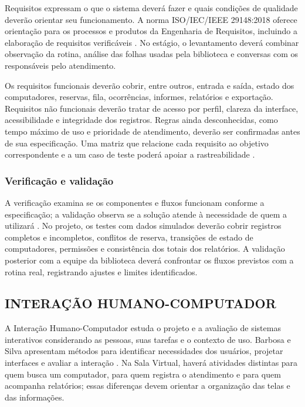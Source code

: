 \documentclass[12pt,a4paper]{article}
\begin{document}
Requisitos expressam o que o sistema deverá fazer e quais condições de qualidade deverão orientar seu funcionamento. A norma ISO/IEC/IEEE 29148:2018 oferece orientação para os processos e produtos da Engenharia de Requisitos, incluindo a elaboração de requisitos verificáveis \cite{iso29148_2018}. No estágio, o levantamento deverá combinar observação da rotina, análise das folhas usadas pela biblioteca e conversas com os responsáveis pelo atendimento.

Os requisitos funcionais deverão cobrir, entre outros, entrada e saída, estado dos computadores, reservas, fila, ocorrências, informes, relatórios e exportação. Requisitos não funcionais deverão tratar de acesso por perfil, clareza da interface, acessibilidade e integridade dos registros. Regras ainda desconhecidas, como tempo máximo de uso e prioridade de atendimento, deverão ser confirmadas antes de sua especificação. Uma matriz que relacione cada requisito ao objetivo correspondente e a um caso de teste poderá apoiar a rastreabilidade \cite{sommerville2016,iso29148_2018}.

\subsubsection{Verificação e validação}

A verificação examina se os componentes e fluxos funcionam conforme a especificação; a validação observa se a solução atende à necessidade de quem a utilizará \cite{sommerville2016}. No projeto, os testes com dados simulados deverão cobrir registros completos e incompletos, conflitos de reserva, transições de estado de computadores, permissões e consistência dos totais dos relatórios. A validação posterior com a equipe da biblioteca deverá confrontar os fluxos previstos com a rotina real, registrando ajustes e limites identificados.

\subsection{INTERAÇÃO HUMANO-COMPUTADOR}

A Interação Humano-Computador estuda o projeto e a avaliação de sistemas interativos considerando as pessoas, suas tarefas e o contexto de uso. Barbosa e Silva apresentam métodos para identificar necessidades dos usuários, projetar interfaces e avaliar a interação \cite{barbosaSilva2010}. Na Sala Virtual, haverá atividades distintas para quem busca um computador, para quem registra o atendimento e para quem acompanha relatórios; essas diferenças devem orientar a organização das telas e das informações.
\end{document}

